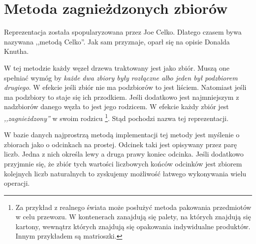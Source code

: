 \section{Metoda zagnieżdzonych zbiorów}

Reprezentacja została spopularyzowana przez Joe Celko\cite{celko-sql}.
Dlatego czasem bywa nazywana ,,metodą Celko''.
Jak sam przyznaje, oparł się na opisie Donalda Knutha\cite{knuth}.





%


W tej metodzie każdy węzeł drzewa traktowany jest jako zbiór.
Muszą one spełniać wymóg by \emph{każde dwa zbiory były rozłączne albo jeden był podzbiorem drugiego}.
W efekcie jeśli zbiór nie ma podzbiorów to jest liściem.
Natomiast jeśli ma podzbiory to staje się ich przodkiem.
Jeśli dodatkowo jest najmniejszym z nadzbiorów danego węzła to jest jego rodzicem.
W efekcie każdy zbiór jest \emph{,,zagnieżdzony''} w swoim rodzicu%
\footnote{
    Za przykład z realnego świata może posłużyć metoda pakowania przedmiotów w celu przewozu.
    W kontenerach zanajdują się palety, na których znajdują się kartony, wewnątrz których znajdują się opakowania indywidualne produktów.
    Innym przykładem są matrioszki.
}.
Stąd pochodzi nazwa tej reprezentacji.

W bazie danych najprostrzą metodą implementacji tej metody jest myślenie o zbiorach jako o odcinkach na prostej.
Odcinek taki jest opisywany przez parę liczb.
Jedna z nich określa lewy a druga prawy koniec odcinka.
Jeśli dodatkowo przyjmnie się, że zbiór tych wartości liczbowych końców odcinków
jest zbiorem kolejnych liczb naturalnych to zyskujemy możliwość łatwego wykonywania wielu operacji.

